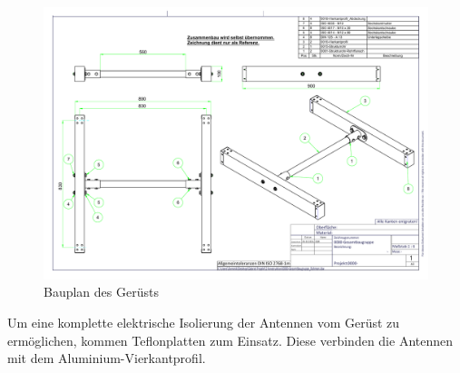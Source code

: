 \begin{figure}[h!]
	\centering
	\includegraphics[keepaspectratio=true,scale=0.5]{../ref/0000-Gesamtbaugruppe_Rahmen.pdf}
	\caption{Bauplan des Gerüsts}
	\label{fig:Gerüst}
\end{figure}

Um eine komplette elektrische Isolierung der Antennen vom Gerüst zu ermöglichen, kommen Teflonplatten zum Einsatz. Diese verbinden die Antennen mit dem Aluminium-Vierkantprofil.

